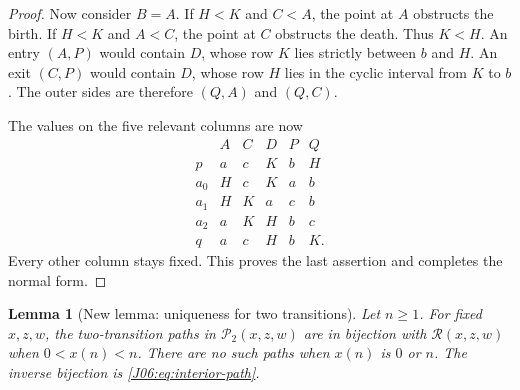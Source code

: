 \documentclass[11pt,oneside]{report}
\newtheorem{lemma}[theorem]{Lemma}
\theoremstyle{definition}
\numberwithin{equation}{section}
\newcommand{\cP}{\mathcal P}
\newcommand{\cR}{\mathcal R}
\begin{document}
\begin{proof}
Now consider $B=A$. If $H<K$ and $C<A$, the point at $A$ obstructs
the birth. If $H<K$ and $A<C$, the point at $C$ obstructs the death.
Thus $K<H$. An entry $(A,P)$ would contain $D$, whose row $K$ lies
strictly between $b$ and $H$. An exit $(C,P)$ would contain $D$, whose
row $H$ lies in the cyclic interval from $K$ to $b$. The outer sides
are therefore $(Q,A)$ and $(Q,C)$.

The values on the five relevant columns are now
\begin{equation}\label{J06:eq:general-table}
\begin{array}{c|rrrrr}
 &A&C&D&P&Q\\\hline
 p   &a&c&K&b&H\\
 a_0 &H&c&K&a&b\\
 a_1 &H&K&a&c&b\\
 a_2 &a&K&H&b&c\\
 q   &a&c&H&b&K .
\end{array}
\end{equation}
Every other column stays fixed. This proves the last assertion and
completes the normal form.
\end{proof}

\begin{lemma}[New lemma: uniqueness for two transitions]
\label{J06:lem:two}
Let $n\ge1$. For fixed $x,z,w$, the two-transition paths in
$\cP_2(x,z,w)$ are in bijection with $\cR(x,z,w)$ when
$0<x(n)<n$. There are no such paths when $x(n)$ is $0$ or $n$.
The inverse bijection is \eqref{J06:eq:interior-path}.
\end{lemma}
\end{document}
